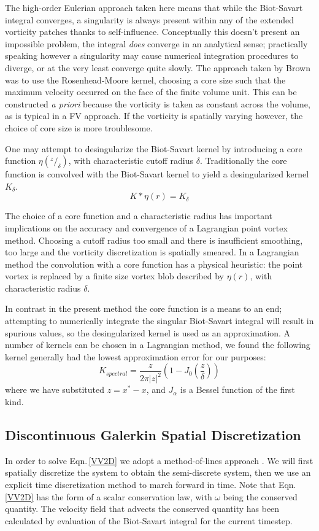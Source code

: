 \documentclass[]{aiaa-tc}%
\newcommand{\ben}[1]{\begin{equation}\label{#1}}
\newcommand{\ee}{\end{equation}}
\begin{document}
The high-order Eulerian approach taken here means that while the Biot-Savart integral converges, a singularity is always present within any of the extended vorticity patches thanks to self-influence. Conceptually this doesn't present an impossible problem, the integral \textit{does} converge in an analytical sense; practically speaking however a singularity may cause numerical integration procedures to diverge, or at the very least converge quite slowly. The approach taken by Brown \cite{Brown2004} was to use the Rosenhead-Moore kernel, choosing a core size such that the maximum velocity occurred on the face of the finite volume unit. This can be constructed \textit{a priori} because the vorticity is taken as constant across the volume, as is typical in a FV approach. If the vorticity is spatially varying however, the choice of core size is more troublesome.

One may attempt to desingularize the Biot-Savart kernel by introducing a core function $\eta(^z/_{\delta})$, with characteristic cutoff radius $\delta$. Traditionally the core function is convolved with the Biot-Savart kernel to yield a desingularized kernel $K_{\delta}$.
\ben{DesingBS} K*\eta(r) = K_{\delta} \ee

The choice of a core function and a characteristic radius has important implications on the accuracy and convergence of a Lagrangian point vortex method. Choosing a cutoff radius too small and there is insufficient smoothing, too large and the vorticity discretization is spatially smeared. In a Lagrangian method the convolution with a core function has a physical heuristic: the point vortex is replaced by a finite size vortex blob described by $\eta(r)$, with characteristic radius $\delta$. 

In contrast in the present method the core function is a means to an end; attempting to numerically integrate the singular Biot-Savart integral will result in spurious values, so the desingularized kernel is used as an approximation. A number of kernels can be chosen in a Lagrangian method, we found the following kernel\cite{WL} generally had the lowest approximation error for our purposes:
\ben{PSkern0}  K_{spectral}= \frac{z}{2 \pi |z|^2} (1-J_0(\frac{z}{\delta})) \ee
where we have substituted $z=x^*-x$, and $J_\alpha$ is a Bessel function of the first kind.

\subsection{Discontinuous Galerkin Spatial Discretization}
In order to solve Eqn.\,\eqref{VV2D} we adopt a method-of-lines approach \cite{RKDG}. We will first spatially discretize the system to obtain the semi-discrete system, then we use an explicit time discretization method to march forward in time. Note that Eqn.\,\eqref{VV2D} has the form of a scalar conservation law, with $\omega$ being the conserved quantity. The velocity field that advects the conserved quantity has been calculated by evaluation of the Biot-Savart integral for the current timestep.
\end{document}
